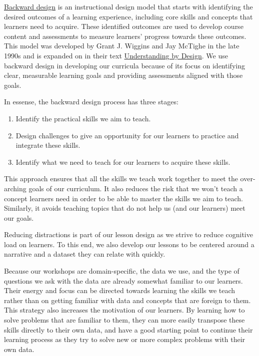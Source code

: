 \documentclass[]{book}
\providecommand{\tightlist}{%
  \setlength{\itemsep}{0pt}\setlength{\parskip}{0pt}}
\begin{document}
\href{https://en.wikipedia.org/wiki/Backward_design}{Backward design} is an instructional
design model that starts with identifying the desired outcomes of a learning experience,
including core skills and concepts that learners need to acquire. These identified outcomes
are used to develop course content and assessments to measure learners' progress towards
these outcomes. This model was developed by Grant J. Wiggins and Jay McTighe in the late
1990s and is expanded on in their text
\href{https://www.pearson.com/us/higher-education/program/Wiggins-Understanding-by-Design-Expanded-Second-Edition-2nd-Edition/PGM229455.html}{Understanding by Design}. We use backward design in developing our curricula because of its focus on identifying clear, measurable
learning goals and providing assessments aligned with those goals.

In essense, the backward design process has three stages:

\begin{enumerate}
\def\labelenumi{\arabic{enumi}.}
\tightlist
\item
  Identify the practical skills we aim to teach.
\item
  Design challenges to give an opportunity for our learners to practice and
  integrate these skills.
\item
  Identify what we need to teach for our learners to acquire these skills.
\end{enumerate}

This approach ensures that all the skills we teach work together to meet the over-arching
goals of our curriculum. It also reduces the risk that we won't teach a concept learners
need in order to be able
to master the skills we aim to teach. Similarly, it avoids teaching topics that do not help us (and our learners) meet our goals.

Reducing distractions is part of our lesson design as we strive to reduce cognitive load on learners. To this end, we also develop our lessons to be centered around a narrative and a dataset they can relate with quickly.

Because our workshops are domain-specific, the data we use, and the type of questions we ask
with the data are already somewhat familiar to our learners. Their energy and focus can be
directed towards learning the skills we teach rather than on getting familiar with data and
concepts that are foreign to them. This strategy also increases the motivation of our
learners. By learning how to solve problems that are familiar to them, they can more easily
transpose these skills directly to their own data, and have a good starting point to
continue their learning process as they try to solve new or more complex problems with their
own data.
\end{document}
